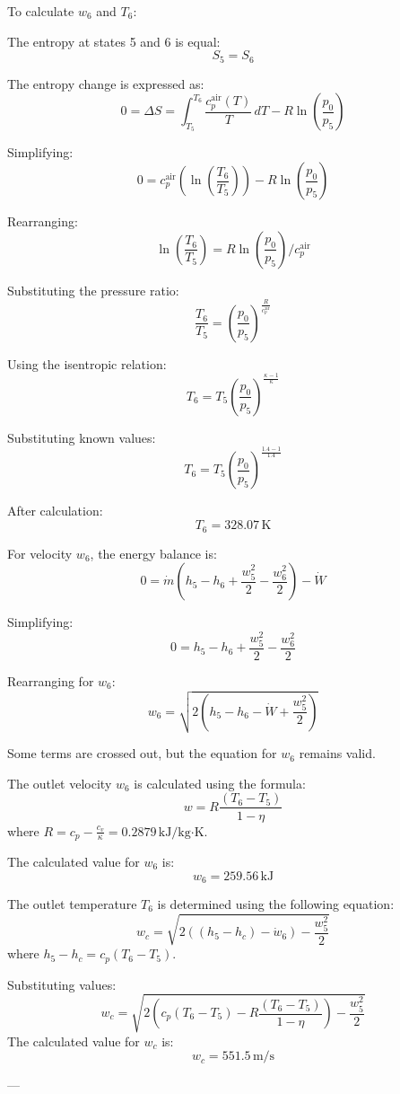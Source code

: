 To calculate \( w_6 \) and \( T_6 \):  

The entropy at states 5 and 6 is equal:  
\[
S_5 = S_6
\]

The entropy change is expressed as:  
\[
0 = \Delta S = \int_{T_5}^{T_6} \frac{c_p^{\text{air}}(T)}{T} \, dT - R \ln \left( \frac{p_0}{p_5} \right)
\]

Simplifying:  
\[
0 = c_p^{\text{air}} \left( \ln \left( \frac{T_6}{T_5} \right) \right) - R \ln \left( \frac{p_0}{p_5} \right)
\]

Rearranging:  
\[
\ln \left( \frac{T_6}{T_5} \right) = R \ln \left( \frac{p_0}{p_5} \right) / c_p^{\text{air}}
\]

Substituting the pressure ratio:  
\[
\frac{T_6}{T_5} = \left( \frac{p_0}{p_5} \right)^{\frac{R}{c_p^{\text{air}}}}
\]

Using the isentropic relation:  
\[
T_6 = T_5 \left( \frac{p_0}{p_5} \right)^{\frac{\kappa - 1}{\kappa}}
\]

Substituting known values:  
\[
T_6 = T_5 \left( \frac{p_0}{p_5} \right)^{\frac{1.4 - 1}{1.4}}
\]

After calculation:  
\[
T_6 = 328.07 \, \text{K}
\]

For velocity \( w_6 \), the energy balance is:  
\[
0 = \dot{m} \left( h_5 - h_6 + \frac{w_5^2}{2} - \frac{w_6^2}{2} \right) - \dot{W}
\]

Simplifying:  
\[
0 = h_5 - h_6 + \frac{w_5^2}{2} - \frac{w_6^2}{2}
\]

Rearranging for \( w_6 \):  
\[
w_6 = \sqrt{2 \left( h_5 - h_6 - \dot{W} + \frac{w_5^2}{2} \right)}
\]  

Some terms are crossed out, but the equation for \( w_6 \) remains valid.

The outlet velocity \( w_6 \) is calculated using the formula:  
\[
w = R \frac{(T_6 - T_5)}{1 - \eta}
\]  
where \( R = c_p - \frac{c_v}{\kappa} = 0.2879 \, \text{kJ/kg·K} \).  

The calculated value for \( w_6 \) is:  
\[
w_6 = 259.56 \, \text{kJ}
\]  

The outlet temperature \( T_6 \) is determined using the following equation:  
\[
w_c = \sqrt{2 \left( (h_5 - h_c) - \dot{w}_6 \right) - \frac{w_5^2}{2}}
\]  
where \( h_5 - h_c = c_p (T_6 - T_5) \).  

Substituting values:  
\[
w_c = \sqrt{2 \left( c_p (T_6 - T_5) - R \frac{(T_6 - T_5)}{1 - \eta} \right) - \frac{w_5^2}{2}}
\]  
The calculated value for \( w_c \) is:  
\[
w_c = 551.5 \, \text{m/s}
\]  

---